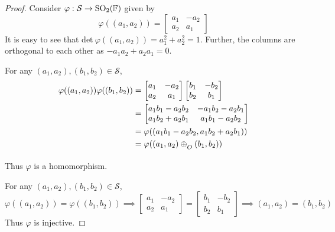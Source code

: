 \begin{proof}
    Consider $\varphi:\mathcal{S} \to \mathrm{SO}_{2}(\mathbb{F})$ given by
    \[ \varphi((a_1,a_2)) = \begin{bmatrix}a_1 & -a_2 \\ a_2 & a_1\end{bmatrix} \]
    It is easy to see that $\mathrm{det}\ \varphi((a_1,a_2))=a_1^2+a_2^2=1$.
    Further, the columns are orthogonal to each other as $-a_1 a_2 + a_2 a_1 = 0$.
    \vspace{1ex}

    \noindent
    For any $(a_1,a_2),(b_1,b_2)\in\mathcal{S}$,
    \begin{align*}
        \varphi((a_1,a_2))\varphi((b_1,b_2))
            &= \begin{bmatrix}a_1 & -a_2 \\ a_2 & a_1\end{bmatrix} \begin{bmatrix}b_1 & -b_2 \\ b_2 & b_1\end{bmatrix} \\
            &= \begin{bmatrix}a_1 b_1 - a_2 b_2 & -a_1 b_2 - a_2 b_1 \\ a_1 b_2 + a_2 b_1 & a_1 b_1 - a_2 b_2\end{bmatrix} \\
            &= \varphi((a_1 b_1 - a_2 b_2, a_1 b_2 + a_2 b_1)) \\
            &= \varphi((a_1,a_2)\conop(b_1,b_2))
    \end{align*}
    Thus $\varphi$ is a homomorphism.
    \vspace{1ex}

    \noindent
    For any $(a_1,a_2),(b_1,b_2)\in\mathcal{S}$,
    \[
        \varphi((a_1,a_2)) = \varphi((b_1,b_2))
        \implies \begin{bmatrix}a_1 & -a_2 \\ a_2 & a_1\end{bmatrix} = \begin{bmatrix}b_1 & -b_2 \\ b_2 & b_1\end{bmatrix}
        \implies (a_1,a_2) = (b_1, b_2)
    \]
    Thus $\varphi$ is injective.
    \vspace{1ex}


\end{proof}
